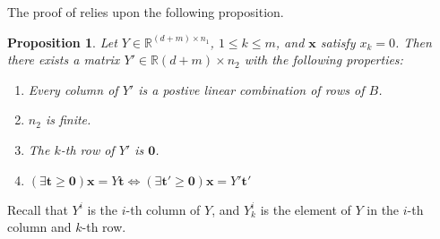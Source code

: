 \documentclass[fleqn]{article}
\renewcommand{\vec}[1]{\mathbf{#1}}
\newcommand{\R}{\mathbb{R}}
\newcommand{\0}{\vec{0}}
\newcommand{\x}{\vec{x}}
\renewcommand{\t}{\vec{t}}
\newcommand{\Yi}{Y^i_{k}}
\newtheorem{Prop}{Proposition}
\begin{document}
The proof of {\Hint} relies upon the following proposition.
\begin{Prop}{\label{Hintset}
Let $Y \in \R^{(d+m)\times n_1}$, $1 \leq k \leq m$, and $\x$ satisfy $x_k = 0$.  Then there exists a matrix $Y' \in \R{(d+m)\times n_2}$ with the following properties:
  \begin{enumerate}
    \item Every column of $Y'$ is a postive linear combination of rows of $B$.
    \item $n_2$ is finite.
    \item The $k$-th row of $Y'$ is $\0$.
    \item \((\exists \t\geq\0)\x = Y\t \Leftrightarrow (\exists \t' \geq \0)\x = Y'\t'\)
  \end{enumerate}
}\end{Prop}
Recall that $ Y^i$ is the $i$-th column of $ Y$, and $\Yi$ is the element of $ Y$ in the $i$-th column and $k$-th row.  
\end{document}
